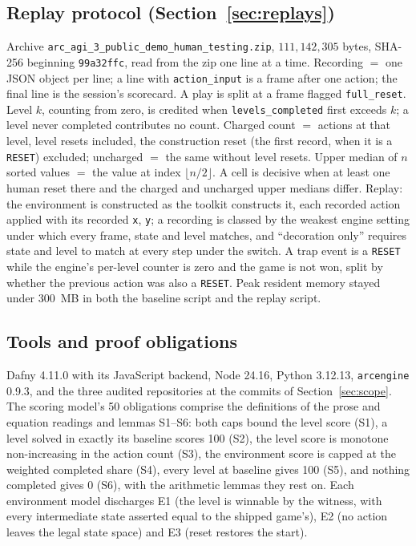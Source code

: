 \documentclass[11pt]{article}
\newcommand{\code}[1]{\texttt{#1}}
\begin{document}
\subsection{Replay protocol (Section~\ref{sec:replays})}
\label{app:replay}

Archive \code{arc\_agi\_3\_public\_demo\_human\_testing.zip}, $111{,}142{,}305$
bytes, SHA-256 beginning \code{99a32ffc}, read from the zip one line at a time.
Recording $=$ one JSON object per line; a line with \code{action\_input} is a
frame after one action; the final line is the session's scorecard. A play is
split at a frame flagged \code{full\_reset}. Level $k$, counting from zero, is
credited when \code{levels\_completed} first exceeds $k$; a level never
completed contributes no count. Charged count $=$ actions at that level, level resets included, the
construction reset (the first record, when it is a \code{RESET}) excluded;
uncharged $=$ the same without level resets. Upper median of $n$ sorted values
$=$ the value at index $\lfloor n/2 \rfloor$. A cell is decisive when at least
one human reset there and the charged and uncharged upper medians differ.
Replay: the environment is constructed as the toolkit constructs it, each
recorded action applied with its recorded \code{x}, \code{y}; a recording is
classed by the weakest engine setting under which every frame, state and level
matches, and ``decoration only'' requires state and level to match at every
step under the switch. A trap event is a \code{RESET} while the engine's
per-level counter is zero and the game is not won, split by whether the
previous action was also a \code{RESET}. Peak resident memory stayed under
300~MB in both the baseline script and the replay script.

\subsection{Tools and proof obligations}

Dafny 4.11.0 with its JavaScript backend, Node 24.16, Python 3.12.13,
\code{arcengine} 0.9.3, and the three audited repositories at the commits of
Section~\ref{sec:scope}. The scoring model's 50 obligations comprise the definitions of
the prose and equation readings and lemmas S1--S6: both caps bound the level
score (S1), a level solved in exactly its baseline scores 100 (S2), the level
score is monotone non-increasing in the action count (S3), the environment score
is capped at the weighted completed share (S4), every level at baseline gives
100 (S5), and nothing completed gives 0 (S6), with the arithmetic lemmas they
rest on. Each environment model discharges E1 (the level is winnable by the
witness, with every intermediate state asserted equal to the shipped game's),
E2 (no action leaves the legal state space) and E3 (reset restores the start).
\end{document}
